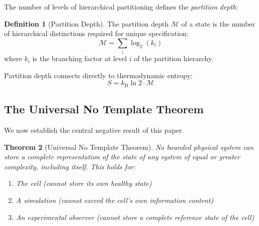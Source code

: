 \documentclass[10pt,twocolumn,a4paper]{article}
\theoremstyle{plain}
\newtheorem{theorem}{Theorem}[section]
\theoremstyle{definition}
\newtheorem{definition}[theorem]{Definition}
\theoremstyle{remark}
\newcommand{\kB}{k_{\mathrm{B}}}
\newcommand{\Depth}{\mathcal{M}}
\begin{document}
The number of levels of hierarchical partitioning defines the \emph{partition depth}:

\begin{definition}[Partition Depth]
\label{def:depth}
The partition depth $\Depth$ of a state is the number of hierarchical distinctions required for unique specification:
\begin{equation}
    \Depth = \sum_{i} \log_2(k_i)
\end{equation}
where $k_i$ is the branching factor at level $i$ of the partition hierarchy.
\end{definition}

Partition depth connects directly to thermodynamic entropy:
\begin{equation}
    S = \kB \ln 2 \cdot \Depth
    \label{eq:depth_entropy}
\end{equation}

\subsection{The Universal No Template Theorem}

We now establish the central negative result of this paper.

\begin{theorem}[Universal No Template Theorem]
\label{thm:no_template}
No bounded physical system can store a complete representation of the state of any system of equal or greater complexity, including itself. This holds for:
\begin{enumerate}[label=(\roman*)]
    \item The cell (cannot store its own healthy state)
    \item A simulation (cannot exceed the cell's own information content)
    \item An experimental observer (cannot store a complete reference state of the cell)
\end{enumerate}
\end{theorem}
\end{document}
